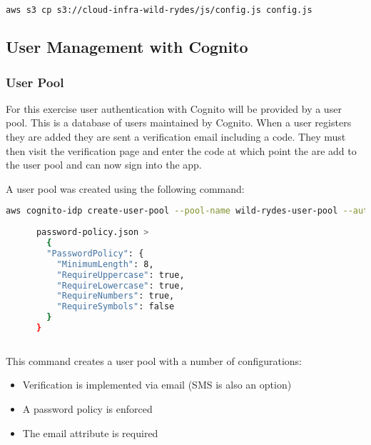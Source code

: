     \noindent\begin{minipage}{\textwidth}
      \begin{lstlisting}[caption={Download config.js},label=download-config,language=bash]
      aws s3 cp s3://cloud-infra-wild-rydes/js/config.js config.js
      \end{lstlisting}
    \end{minipage}
  
  \subsection{User Management with Cognito}
  
    \subsubsection{User Pool}
    For this exercise user authentication with Cognito will be provided by a user pool. This is a database of users maintained by Cognito. When a user registers they are added they are sent a verification email including a code. They must then visit the verification page and enter the code at which point the are add to the user pool and can now sign into the app.
    
    A user pool was created using the following command:
    
    \noindent\begin{minipage}{\textwidth}
      \begin{lstlisting}[caption={Create User Pool},label=create-user-pool,language=bash]
      aws cognito-idp create-user-pool --pool-name wild-rydes-user-pool --auto-verified-attributes email --policies file://password-policy.json --schema '{"Name":"email","Required":true,"AttributeDataType":"String"}'
    
      password-policy.json >
        {
        "PasswordPolicy": {
          "MinimumLength": 8,
          "RequireUppercase": true,
          "RequireLowercase": true,
          "RequireNumbers": true,
          "RequireSymbols": false
        }
      }
  
      \end{lstlisting}
    \end{minipage}
    This command creates a user pool with a number of configurations:
    \begin{itemize}
      \item Verification is implemented via email (SMS is also an option)
      \item A password policy is enforced
      \item The email attribute is required
    \end{itemize}
    
